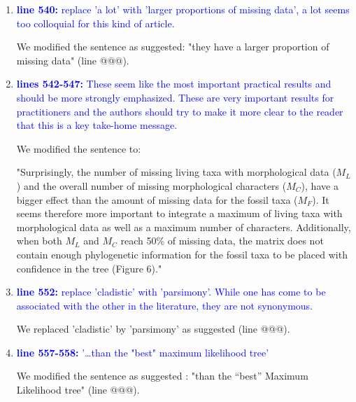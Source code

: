 \documentclass[12pt,letterpaper]{article}
\begin{document}
\begin{enumerate}

\item{\textcolor{blue}{\textbf{line 540:} replace 'a lot' with 'larger proportions of missing data', a lot seems too colloquial for this kind of article. }}

We modified the sentence as suggested: "they have a larger proportion of missing data" (line @@@).

\item{\textcolor{blue}{\textbf{lines 542-547:} These seem like the most important practical results and should be more strongly emphasized. These are very important results for practitioners and the authors should try to make it more clear to the reader that this is a key take-home message.}}

We modified the sentence to:

"Surprisingly, the number of missing living taxa with morphological data ($M_{L}$) and the overall number of missing morphological characters ($M_{C}$), have a bigger effect than the amount of missing data for the fossil taxa ($M_{F}$).
It seems therefore more important to integrate a maximum of living taxa with morphological data as well as a maximum number of characters.
Additionally, when both $M_{L}$ and $M_{C}$ reach 50\% of missing data, the matrix does not contain enough phylogenetic information for the fossil taxa to be placed with confidence in the tree (Figure 6)."


\item{\textcolor{blue}{\textbf{line 552:} replace 'cladistic' with 'parsimony'. While one has come to be associated with the other in the literature, they are not synonymous. }}

We replaced 'cladistic' by 'parsimony' as suggested (line @@@).

\item{\textcolor{blue}{\textbf{line 557-558:} '…than the "best" maximum likelihood tree'}}

We modified the sentence as suggested : "than the ``best'' Maximum Likelihood tree" (line @@@).


\end{enumerate}
\end{document}

